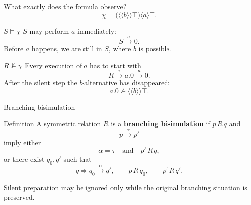 \documentclass[handout,aspectratio=169,11pt]{beamer}
\newcommand{\step}[1]{\xrightarrow{#1}}
\newcommand{\Takeaway}[1]{\begin{exampleblock}{}#1\end{exampleblock}}
\begin{document}
\begin{frame}{What exactly does the formula observe?}
  \[
      \chi=
      \bigl(\langle\!\langle b\rangle\!\rangle\top\bigr)
      \langle a\rangle\top.
  \]

  \begin{block}{$S\models\chi$}
    $S$ may perform $a$ immediately:
    \[
       S\step{a}0.
    \]
    Before $a$ happens, we are still in $S$, where $b$ is possible.
  \end{block}

  \vspace{-0.3cm}
  \begin{alertblock}{$R\not\models\chi$}
    Every execution of $a$ has to start with
    \[
       R\step{\tau}a.0\step{a}0.
    \]
    After the silent step the $b$-alternative has disappeared:
    \[
       a.0\not\models
       \langle\!\langle b\rangle\!\rangle\top.
    \]
  \end{alertblock}

\end{frame}


\begin{frame}{Branching bisimulation}
  \begin{block}{Definition}
    A symmetric relation $R$ is a \textbf{branching bisimulation} if
    $p\,R\,q$ and
    \[
       p\step{\alpha}p'
    \]
    imply either
    \[
       \alpha=\tau
       \quad\text{and}\quad p'\,R\,q,
    \]
    or there exist $q_0,q'$ such that
    \[
       q\Rightarrow q_0\step{\alpha}q',
       \qquad
       p\,R\,q_0,
       \qquad
       p'\,R\,q'.
    \]
  \end{block}

  \begin{center}
  \end{center}

  \Takeaway{Silent preparation may be ignored only while the original
  branching situation is preserved.}
\end{frame}
\end{document}
